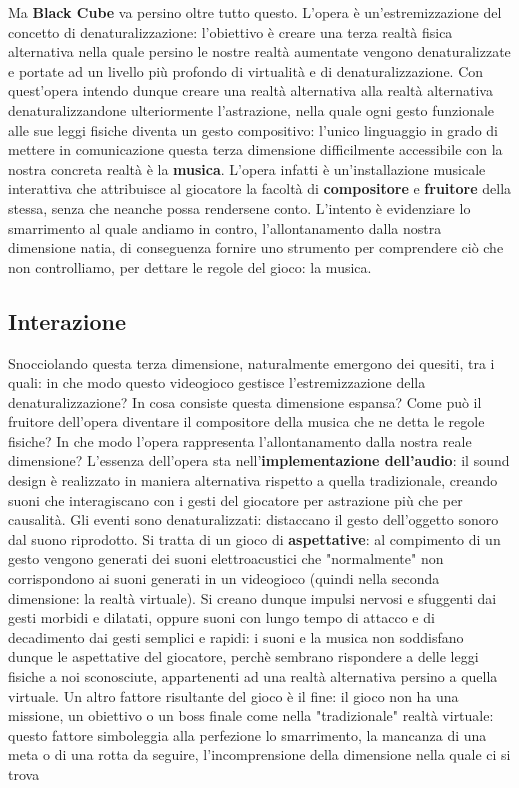 	Ma \textbf{Black Cube} va persino oltre tutto questo. L'opera è un'estremizzazione del concetto di denaturalizzazione: l'obiettivo è creare una terza realtà fisica alternativa nella quale persino le nostre realtà aumentate vengono denaturalizzate e portate ad un livello più profondo di virtualità e di denaturalizzazione.
	Con quest'opera intendo dunque creare una realtà alternativa alla realtà alternativa denaturalizzandone ulteriormente l'astrazione, nella quale ogni gesto funzionale alle sue leggi fisiche diventa un gesto compositivo: l'unico linguaggio in grado di mettere in comunicazione questa terza dimensione difficilmente accessibile con la nostra concreta realtà è la \textbf{musica}.
	L'opera infatti è un'installazione musicale interattiva che attribuisce al giocatore la facoltà di \textbf{compositore} e \textbf{fruitore} della stessa, senza che neanche possa rendersene conto.
	L'intento è evidenziare lo smarrimento al quale andiamo in contro, l'allontanamento dalla nostra dimensione natia, di conseguenza fornire uno strumento per comprendere ciò che non controlliamo, per dettare le regole del gioco: la musica.
	
	\subsection{Interazione}
	Snocciolando questa terza dimensione, naturalmente emergono dei quesiti, tra i quali: in che modo questo videogioco gestisce l'estremizzazione della denaturalizzazione? In cosa consiste questa dimensione espansa? Come può il fruitore dell'opera diventare il compositore della musica che ne detta le regole fisiche? In che modo  l'opera rappresenta l'allontanamento dalla nostra reale dimensione?
	L'essenza dell'opera sta nell'\textbf{implementazione dell'audio}: il sound design è realizzato in maniera alternativa rispetto a quella tradizionale, creando suoni che interagiscano con i gesti del giocatore per astrazione più che per causalità. Gli eventi sono denaturalizzati: distaccano il gesto dell'oggetto sonoro dal suono riprodotto.
	Si tratta di un gioco di \textbf{aspettative}: al compimento di un gesto vengono generati dei suoni elettroacustici che "normalmente" non corrispondono ai suoni generati in un videogioco (quindi nella seconda dimensione: la realtà virtuale). Si creano dunque impulsi nervosi e sfuggenti dai gesti morbidi e dilatati, oppure suoni con lungo tempo di attacco e di decadimento dai gesti semplici e rapidi: i suoni e la musica non soddisfano dunque le aspettative del giocatore, perchè sembrano rispondere a delle leggi fisiche a noi sconosciute, appartenenti ad una realtà alternativa persino a quella virtuale.
	Un altro fattore risultante del gioco è il fine: il gioco non ha una missione, un obiettivo o un boss finale come nella "tradizionale" realtà virtuale: questo fattore simboleggia alla perfezione lo smarrimento, la mancanza di una meta o di una rotta da seguire, l'incomprensione della dimensione nella quale ci si trova
	
